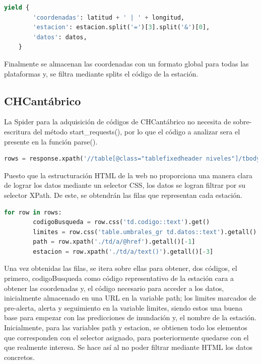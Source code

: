 \begin{lstlisting}[language=Python, caption={Guardado de datos de Aemet Data Spider}]
	yield {
		'coordenadas': latitud + ' | ' + longitud,
		'estacion': estacion.split('=')[3].split('&')[0],
		'datos': datos,
	}
\end{lstlisting}

Finalmente se almacenan las coordenadas con un formato global para todas las plataformas y, se filtra mediante splits el código de la estación.

\subsection{CHCantábrico}
La Spider para la adquisición de códigos de CHCantábrico no necesita de sobre-escritura del método start\_requests(), por lo que el código a analizar sera el presente en la función parse().

\begin{lstlisting}[language=Python, caption={Selector en parse() de Chcantabrico Code Spider}]
	rows = response.xpath('//table[@class="tablefixedheader niveles"]/tbody/tr')
\end{lstlisting}

Puesto que la estructuración HTML de la web no proporciona una manera clara de lograr los datos mediante un selector CSS, los datos se logran filtrar por su selector XPath. De este, se obtendrán las filas que representan cada estación.

\begin{lstlisting}[language=Python, caption={Trabajar sobre los datos de Chcantabrico Code Spider}]
	for row in rows:
		codigoBusqueda = row.css('td.codigo::text').get()
		limites = row.css('table.umbrales_gr td.datos::text').getall()
		path = row.xpath('./td/a/@href').getall()[-1]
		estacion = row.xpath('./td/a/text()').getall()[-3]
\end{lstlisting}

Una vez obtenidas las filas, se itera sobre ellas para obtener, dos códigos, el primero, codigoBusqueda como código representativo de la estación cara a obtener las coordenadas y, el código necesario para acceder a los datos, inicialmente almacenado en una URL en la variable path; los limites marcados de pre-alerta, alerta y seguimiento en la variable limites, siendo estos una buena base para empezar con las predicciones de inundación y, el nombre de la estación.\newline
\newline
Inicialmente, para las variables path y estacion, se obtienen todo los elementos que corresponden con el selector asignado, para posteriormente quedarse con el que realmente interesa. Se hace así al no poder filtrar mediante HTML los datos concretos.

